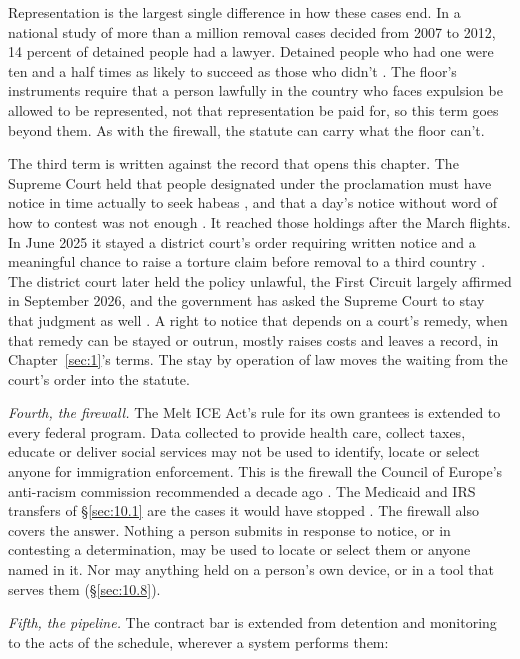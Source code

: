 Representation is the largest single difference in how these cases end. In a national study of more than a million removal cases decided from 2007 to 2012, 14 percent of detained people had a lawyer. Detained people who had one were ten and a half times as likely to succeed as those who didn't \autocite{EaglyShafer2016Counsel}. The floor's instruments require that a person lawfully in the country who faces expulsion be allowed to be represented, not that representation be paid for, so this term goes beyond them. As with the firewall, the statute can carry what the floor can't.

The third term is written against the record that opens this chapter. The Supreme Court held that people designated under the proclamation must have notice in time actually to seek habeas \autocite{jgg2025}, and that a day's notice without word of how to contest was not enough \autocite{aarp2025}. It reached those holdings after the March flights. In June 2025 it stayed a district court's order requiring written notice and a meaningful chance to raise a torture claim before removal to a third country \autocite{dvd2025}. The district court later held the policy unlawful, the First Circuit largely affirmed in September 2026, and the government has asked the Supreme Court to stay that judgment as well \autocite{dvd2026application}. A right to notice that depends on a court's remedy, when that remedy can be stayed or outrun, mostly raises costs and leaves a record, in Chapter~\ref{sec:1}'s terms. The stay by operation of law moves the waiting from the court's order into the statute.

\emph{Fourth, the firewall.} The Melt ICE Act's rule for its own grantees is extended to every federal program. Data collected to provide health care, collect taxes, educate or deliver social services may not be used to identify, locate or select anyone for immigration enforcement. This is the firewall the Council of Europe's anti-racism commission recommended a decade ago \autocite{ecri2016gpr16}. The Medicaid and IRS transfers of \S\ref{sec:10.1} are the cases it would have stopped \autocite{JoffeBlock2026MedicaidPalantir,Shaw2026IRSICE}. The firewall also covers the answer. Nothing a person submits in response to notice, or in contesting a determination, may be used to locate or select them or anyone named in it. Nor may anything held on a person's own device, or in a tool that serves them (\S\ref{sec:10.8}).

\emph{Fifth, the pipeline.} The contract bar is extended from detention and monitoring to the acts of the schedule, wherever a system performs them:

